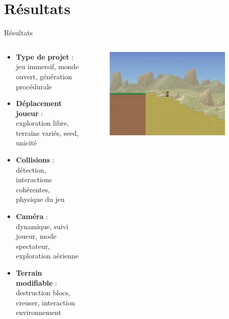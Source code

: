 \documentclass[aspectratio=169]{beamer}
\begin{document}
\section{Résultats}

\begin{frame}{Résultats}
    \begin{columns}
        \centering
        \begin{column}{0.5\textwidth}
            \centering
            \begin{itemize}
                \item \textbf{Type de projet} : jeu immersif, monde ouvert, génération procédurale
                \item \textbf{Déplacement joueur} : exploration libre, terrains variés, seed, unicité
                \item \textbf{Collisions} : détection, interactions cohérentes, physique du jeu
                \item \textbf{Caméra} : dynamique, suivi joueur, mode spectateur, exploration aérienne
                \item \textbf{Terrain modifiable} : destruction blocs, creuser, interaction environnement
            \end{itemize}
        \end{column}
        \begin{column}{0.5\textwidth}
            \centering
            \begin{figure}
                \centering
                \captionsetup{format=sanslabel}
                \includegraphics[width=0.9\textwidth]{assets/background_1.png}
            \end{figure}
        \end{column}
    \end{columns}
\end{frame}
\end{document}
